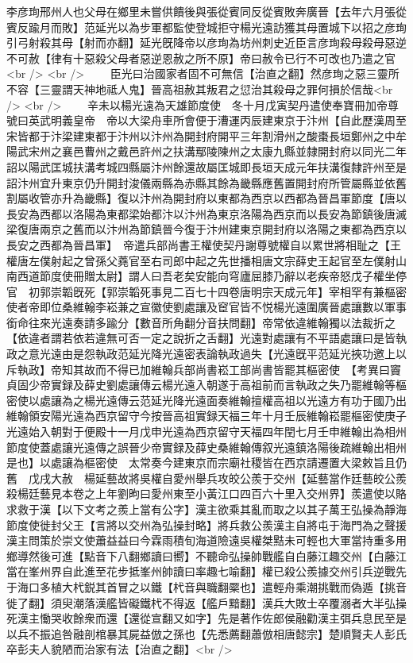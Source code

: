 李彦珣邢州人也父母在鄉里未嘗供饋後與張從賓同反從賓敗奔廣晉【去年六月張從賓反踰月而敗】范延光以為步軍都監使登城拒守楊光遠訪獲其母置城下以招之彦珣引弓射殺其母【射而亦翻】延光旣降帝以彦珣為坊州刺史近臣言彦珣殺母殺母惡逆不可赦【律有十惡殺父母者惡逆恩赦之所不原】帝曰赦令已行不可改也乃遣之官<br />
<br />
　　臣光曰治國家者固不可無信【治直之翻】然彦珣之惡三靈所不容【三靈謂天神地祗人鬼】晉高祖赦其叛君之愆治其殺母之罪何損於信哉<br />
<br />
　　辛未以楊光遠為天雄節度使　冬十月戊寅契丹遣使奉寶冊加帝尊號曰英武明義皇帝　帝以大梁舟車所會便于漕運丙辰建東京于汴州【自此歷漢周至宋皆都于汴梁建東都于汴州以汴州為開封府開平三年割滑州之酸棗長垣鄭州之中牟陽武宋州之襄邑曹州之戴邑許州之扶溝鄢陵陳州之太康九縣並隸開封府以同光二年詔以陽武匡城扶溝考城四縣屬汴州餘還故屬匡城即長垣天成元年扶溝復隸許州至是詔汴州宜升東京仍升開封浚儀兩縣為赤縣其餘為畿縣應舊置開封府所管屬縣並依舊割屬收管亦升為畿縣】復以汴州為開封府以東都為西京以西都為晉昌軍節度【唐以長安為西都以洛陽為東都梁始都汴以汴州為東京洛陽為西京而以長安為節鎮後唐滅梁復唐兩京之舊而以汴州為節鎮晉今復于汴州建東京開封府以洛陽之東都為西京以長安之西都為晉昌軍】　帝遣兵部尚書王權使契丹謝尊號權自以累世將相耻之【王權唐左僕射起之曾孫父蕘官至右司郎中起之先世播相唐文宗薛史王起官至左僕射山南西道節度使冊贈太尉】謂人曰吾老矣安能向穹廬屈膝乃辭以老疾帝怒戊子權坐停官　初郭崇韜旣死【郭崇韜死事見二百七十四卷唐明宗天成元年】宰相罕有兼樞密使者帝即位桑維翰李崧兼之宣徽使劉處讓及䆠官皆不悦楊光遠圍廣晉處讓數以軍事銜命往來光遠奏請多踰分【數音所角翻分音扶問翻】帝常依違維翰獨以法裁折之【依違者謂若依若違無可否一定之說折之舌翻】光遠對處讓有不平語處讓曰是皆執政之意光遠由是怨執政范延光降光遠密表論執政過失【光遠旣平范延光挾功邀上以斥執政】帝知其故而不得已加維翰兵部尚書崧工部尚書皆罷其樞密使　【考異曰竇貞固少帝實録及薛史劉處讓傳云楊光遠入朝遂于高祖前而言執政之失乃罷維翰等樞密使以處讓為之楊光遠傳云范延光降光遠面奏維翰擅權高祖以光遠方有功于國乃出維翰領安陽光遠為西京留守今按晉高祖實録天福三年十月壬辰維翰崧罷樞密使庚子光遠始入朝對于便殿十一月戊申光遠為西京留守天福四年閏七月壬申維翰出為相州節度使蓋處讓光遠傳之誤晉少帝實録及薛史桑維翰傳叙光遠鎮洛陽後疏維翰出相州是也】以處讓為樞密使　太常奏今建東京而宗廟社稷皆在西京請遷置大梁敕旨且仍舊　戊戌大赦　楊延藝故將吳權自愛州舉兵攻皎公羨于交州【延藝當作廷藝皎公羨殺楊廷藝見本卷之上年劉昫曰愛州東至小黃江口四百六十里入交州界】羨遣使以賂求救于漢【以下文考之羨上當有公字】漢主欲乘其亂而取之以其子萬王弘操為靜海節度使徙封父王【言將以交州為弘操封略】將兵救公羨漢主自將屯于海門為之聲援漢主問策於崇文使蕭益益曰今霖雨積旬海道險遠吳權桀黠未可輕也大軍當持重多用鄉導然後可進【點音下八翻鄉讀曰嚮】不聽命弘操帥戰艦自白藤江趣交州【白藤江當在峯州界自此進至花步抵峯州帥讀曰率趣七喻翻】權已殺公羨據交州引兵逆戰先于海口多植大杙鋭其首冒之以鐵【杙音與職翻橜也】遣輕舟乘潮挑戰而偽遁【挑音徙了翻】須臾潮落漢艦皆礙鐵杙不得返【艦戶黯翻】漢兵大敗士卒覆溺者大半弘操死漢主慟哭收餘衆而還【還從宣翻又如字】先是著作佐郎侯融勸漢主弭兵息民至是以兵不振追咎融剖棺暴其屍益倣之孫也【先悉薦翻蕭倣相唐懿宗】楚順賢夫人彭氏卒彭夫人貌陋而治家有法【治直之翻】<br />
